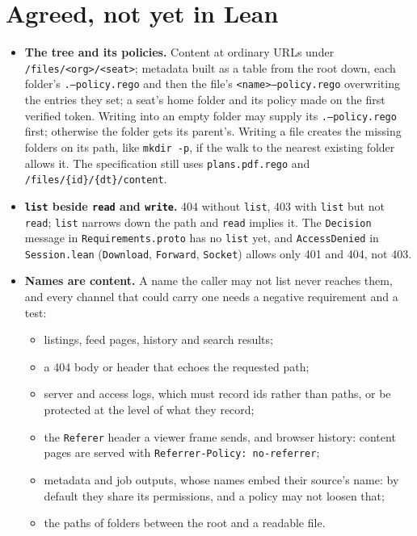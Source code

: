 \section{Agreed, not yet in Lean}
\begin{itemize}\tightlist
\item \textbf{The tree and its policies.} Content at ordinary URLs under
  \texttt{/files/<org>/<seat>}; metadata built as a table from the root down, each
  folder's \texttt{.--policy.rego} and then the file's
  \texttt{<name>--policy.rego} overwriting the entries they set; a seat's home
  folder and its policy made on the first verified token. Writing into an empty
  folder may supply its \texttt{.--policy.rego} first; otherwise the folder gets
  its parent's. Writing a file creates the missing folders on its path, like
  \texttt{mkdir -p}, if the walk to the nearest existing folder allows it. The
  specification still uses \texttt{plans.pdf.rego} and
  \texttt{/files/\{id\}/\{dt\}/content}.
\item \textbf{\texttt{list} beside \texttt{read} and \texttt{write}.} 404 without
  \texttt{list}, 403 with \texttt{list} but not \texttt{read}; \texttt{list}
  narrows down the path and \texttt{read} implies it. The \texttt{Decision}
  message in \texttt{Requirements.proto} has no \texttt{list} yet, and
  \texttt{AccessDenied} in \texttt{Session.lean} (\texttt{Download},
  \texttt{Forward}, \texttt{Socket}) allows only 401 and 404, not 403.
\item \textbf{Names are content.} A name the caller may not list never reaches
  them, and every channel that could carry one needs a negative requirement and a
  test:
  \begin{itemize}\tightlist
  \item listings, feed pages, history and search results;
  \item a 404 body or header that echoes the requested path;
  \item server and access logs, which must record ids rather than paths, or be
    protected at the level of what they record;
  \item the \texttt{Referer} header a viewer frame sends, and browser history:
    content pages are served with \texttt{Referrer-Policy: no-referrer};
  \item metadata and job outputs, whose names embed their source's name: by
    default they share its permissions, and a policy may not loosen that;
  \item the paths of folders between the root and a readable file.

\end{itemize}
\end{itemize}
